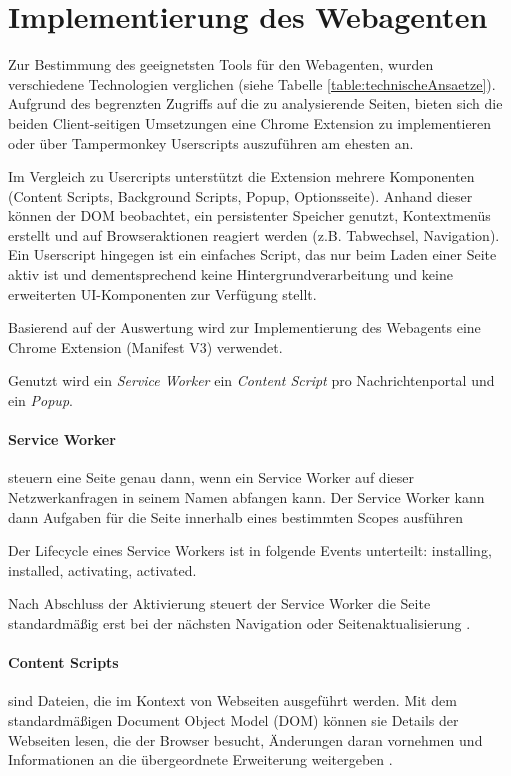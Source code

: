 \section{Implementierung des Webagenten}

Zur Bestimmung des geeignetsten Tools für den Webagenten,
wurden verschiedene Technologien verglichen (siehe Tabelle \ref{table:technischeAnsaetze}).
Aufgrund des begrenzten Zugriffs auf die zu analysierende Seiten, bieten sich die beiden Client-seitigen Umsetzungen 
eine Chrome Extension zu implementieren oder über Tampermonkey Userscripts auszuführen am ehesten an.

Im Vergleich zu Usercripts unterstützt die Extension mehrere Komponenten (Content Scripts, Background Scripts, Popup, Optionsseite).
Anhand dieser können der DOM beobachtet, ein persistenter Speicher genutzt, Kontextmenüs erstellt und auf Browseraktionen reagiert werden (z.B. Tabwechsel, Navigation).
Ein Userscript hingegen ist ein einfaches Script, das nur beim Laden einer Seite aktiv ist und dementsprechend keine Hintergrundverarbeitung und keine erweiterten UI-Komponenten
zur Verfügung stellt.

Basierend auf der Auswertung wird zur Implementierung des Webagents eine Chrome Extension (Manifest V3) verwendet.

Genutzt wird ein \textit{Service Worker} ein \textit{Content Script} pro Nachrichtenportal und ein \textit{Popup}.

\paragraph{Service Worker} steuern eine Seite genau dann, wenn ein Service Worker auf dieser Netzwerkanfragen in seinem Namen abfangen kann. 
Der Service Worker kann dann Aufgaben für die Seite innerhalb eines bestimmten Scopes ausführen

Der Lifecycle eines Service Workers ist in folgende Events unterteilt: installing, installed, activating, activated.

Nach Abschluss der Aktivierung steuert der Service Worker die Seite standardmäßig erst 
bei der nächsten Navigation oder Seitenaktualisierung \cite{chrome2025serviceworker}.

\paragraph{Content Scripts} sind Dateien, die im Kontext von Webseiten ausgeführt werden. 
Mit dem standardmäßigen Document Object Model (DOM) können sie Details der Webseiten lesen, die der Browser besucht, 
Änderungen daran vornehmen und Informationen an die übergeordnete Erweiterung weitergeben \cite{chrome2025contentscripts}.

